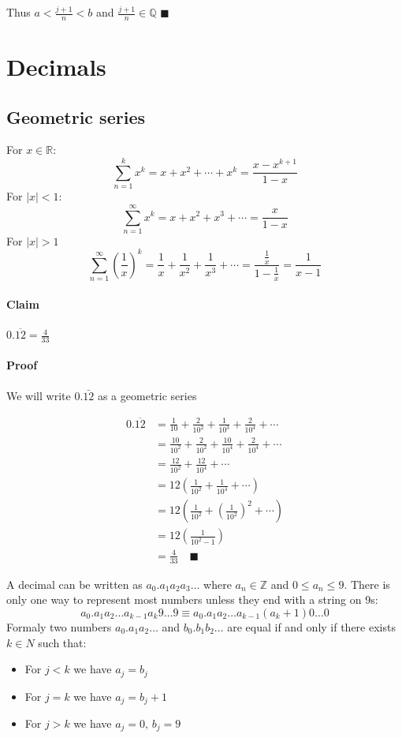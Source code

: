 \documentclass{article}
\newcommand{\bb}[1]{\mathbb{#1}}
\begin{document}
Thus \(a<\frac{j+1}{n}<b\) and \(\frac{j+1}{n}\in\bb Q\) \(\blacksquare\)

\section{Decimals}

\subsection*{Geometric series}

For \(x\in\bb R\):
\[\sum_{n=1}^k x^k=x+x^2+\dotsb+x^k=\frac{x-x^{k+1}}{1-x}\]
For \(|x|<1\):
\[\sum_{n=1}^\infty x^k=x+x^2+x^3+\dotsb=\frac{x}{1-x}\]
For \(|x|>1\)
\[\sum_{n=1}^\infty (\frac 1x)^k=\frac{1}{x}+\frac{1}{x^2}+\frac{1}{x^3}+\dotsb=\frac{\frac 1x}{1-\frac 1x}=\frac{1}{x-1}\]

\paragraph{Claim} \(0.\overline{12}=\frac{4}{33}\)

\paragraph{Proof} We will write \(0.\bar{12}\) as a geometric series

\begin{align*}
0.\overline{12}&=\frac{1}{10}+\frac{2}{10^2}+\frac{1}{10^3}+\frac{2}{10^4}+\dotsb\\
&=\frac{10}{10^2}+\frac{2}{10^2}+\frac{10}{10^4}+\frac{2}{10^4}+\dotsb\\
&=\frac{12}{10^2}+\frac{12}{10^4}+\dotsb\\
&=12\left(\frac{1}{10^2}+\frac{1}{10^4}+\dotsb\right)\\
&=12\left(\frac{1}{10^2}+\left(\frac{1}{10^2}\right)^2+\dotsb\right)\\
&=12\left(\frac{1}{10^2-1}\right)\\
&=\frac{4}{33}\quad\blacksquare
\end{align*}

A decimal can be written as \(a_0.a_1a_2a_3\dotso\) where \(a_n\in\bb Z\) and \(0\le a_n\le9\). There is only one way to represent most numbers unless they end with a string on 9s:
\[a_0.a_1a_2\dotso a_{k-1}a_k9\dotso9\equiv a_0.a_1a_2\dotso a_{k-1}(a_k+1)0\dotso0\]
Formaly two numbers \(a_0.a_1a_2\dotso\) and \(b_0.b_1b_2\dotso\) are equal if and only if there exists \(k\in N\) such that:
\begin{itemize}
\item For \(j<k\) we have \(a_j=b_j\)
\item For \(j=k\) we have \(a_j=b_j+1\)
\item For \(j>k\) we have \(a_j=0,\,b_j=9\)
\end{itemize}
\end{document}
